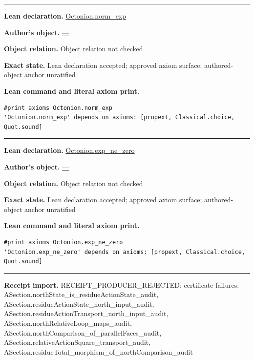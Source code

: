 \documentclass[11pt]{article}
\theoremstyle{plain}
\theoremstyle{definition}
\theoremstyle{remark}
\begin{document}
\begin{tcolorbox}
\medskip\hrule\medskip
\textbf{Lean declaration.} \url{Octonion.norm_exp}
\par\textbf{Author's object.} \url{—}
\par\textbf{Object relation.} Object relation not checked
\par\textbf{Exact state.} Lean declaration accepted; approved axiom surface; authored-object anchor unratified
\par\smallskip\textbf{Lean command and literal axiom print.}
\begin{Verbatim}[breaklines=true,breakanywhere=true,fontsize=\small]
#print axioms Octonion.norm_exp
'Octonion.norm_exp' depends on axioms: [propext, Classical.choice, Quot.sound]
\end{Verbatim}
\medskip\hrule\medskip
\textbf{Lean declaration.} \url{Octonion.exp_ne_zero}
\par\textbf{Author's object.} \url{—}
\par\textbf{Object relation.} Object relation not checked
\par\textbf{Exact state.} Lean declaration accepted; approved axiom surface; authored-object anchor unratified
\par\smallskip\textbf{Lean command and literal axiom print.}
\begin{Verbatim}[breaklines=true,breakanywhere=true,fontsize=\small]
#print axioms Octonion.exp_ne_zero
'Octonion.exp_ne_zero' depends on axioms: [propext, Classical.choice, Quot.sound]
\end{Verbatim}
\medskip\hrule\medskip
\textbf{Receipt import.} \textcolor{KgtRed}{RECEIPT\_PRODUCER\_REJECTED: certificate failures: ASection.northState\_is\_residueActionState\_audit, ASection.residueActionState\_north\_input\_audit, ASection.residueActionTransport\_north\_input\_audit, ASection.northRelativeLoop\_maps\_audit, ASection.northComparison\_of\_parallelFaces\_audit, ASection.relativeActionSquare\_transport\_audit, ASection.residueTotal\_morphism\_of\_northComparison\_audit}
\end{tcolorbox}
\medskip
\end{document}

